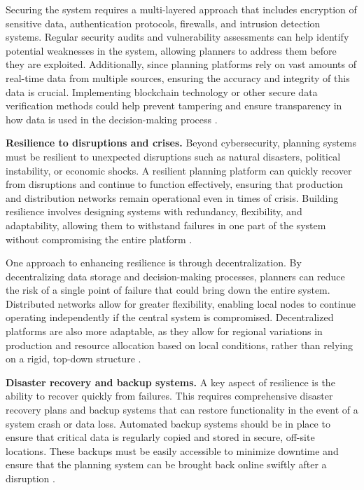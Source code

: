 \begin{refsection}
Securing the system requires a multi-layered approach that includes encryption of sensitive data, authentication protocols, firewalls, and intrusion detection systems. Regular security audits and vulnerability assessments can help identify potential weaknesses in the system, allowing planners to address them before they are exploited. Additionally, since planning platforms rely on vast amounts of real-time data from multiple sources, ensuring the accuracy and integrity of this data is crucial. Implementing blockchain technology or other secure data verification methods could help prevent tampering and ensure transparency in how data is used in the decision-making process \cite[pp.~231]{antonopoulos2018blockchain}.

\textbf{Resilience to disruptions and crises.} Beyond cybersecurity, planning systems must be resilient to unexpected disruptions such as natural disasters, political instability, or economic shocks. A resilient planning platform can quickly recover from disruptions and continue to function effectively, ensuring that production and distribution networks remain operational even in times of crisis. Building resilience involves designing systems with redundancy, flexibility, and adaptability, allowing them to withstand failures in one part of the system without compromising the entire platform \cite[pp.~83]{sheffi2005resilience}.

One approach to enhancing resilience is through decentralization. By decentralizing data storage and decision-making processes, planners can reduce the risk of a single point of failure that could bring down the entire system. Distributed networks allow for greater flexibility, enabling local nodes to continue operating independently if the central system is compromised. Decentralized platforms are also more adaptable, as they allow for regional variations in production and resource allocation based on local conditions, rather than relying on a rigid, top-down structure \cite[pp.~102]{restakis2012humanizing}.

\textbf{Disaster recovery and backup systems.} A key aspect of resilience is the ability to recover quickly from failures. This requires comprehensive disaster recovery plans and backup systems that can restore functionality in the event of a system crash or data loss. Automated backup systems should be in place to ensure that critical data is regularly copied and stored in secure, off-site locations. These backups must be easily accessible to minimize downtime and ensure that the planning system can be brought back online swiftly after a disruption \cite[pp.~76]{smil2018energy}.


\end{refsection}
